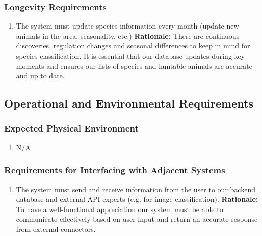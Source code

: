 \documentclass[]{article}
\begin{document}
\subsubsection{Longevity Requirements}
\label{ssub:longevity_requirements}
\begin{enumerate}[{PR-L}1. ]
	\item The system must update species information every month (update new animals in the area, seasonality, etc.)
	\newline \textbf{Rationale:} There are continuous discoveries, regulation changes and seasonal differences to keep in mind for species classification. It is essential that our database updates during key moments and ensures our lists of species and huntable animals are accurate and up to date. 
\end{enumerate}


\subsection{Operational and Environmental Requirements}
\label{sub:operational_and_environmental_requirements}

\subsubsection{Expected Physical Environment}
\label{ssub:expected_physical_environment}
\begin{enumerate}[{OE-EPE}1. ]
	\item N/A
\end{enumerate}

\subsubsection{Requirements for Interfacing with Adjacent Systems}
\label{ssub:requirements_for_interfacing_with_adjacent_systems}
\begin{enumerate}[{OE-IA}1. ]
	\item The system must send and receive information from the user to our backend database and external API experts (e.g. for image classification).
	\newline \textbf{Rationale: }To have a well-functional appreciation our system must be able to communicate effectively based on user input and return an accurate response from external connectors. 
\end{enumerate}
\end{document}
